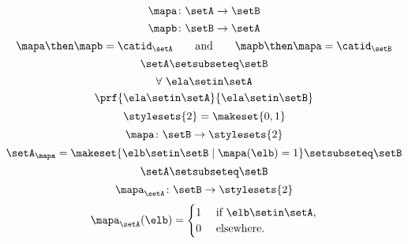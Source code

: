 \begin{forslides}
    \begin{equation}\label{eq:slides_session2_183}
        \mapa\colon \setA \to \setB
    \end{equation}
    \begin{equation}\label{eq:slides_session2_184}
        \mapb \colon \setB \to \setA
    \end{equation}
    \begin{equation}\label{eq:slides_session2_185}
        \mapa \then \mapb = \catid_\setA \qquad \text{and}  \qquad \mapb \then \mapa = \catid_\setB
    \end{equation}
    \begin{equation}\label{eq:slides_session2_186}
        \setA \setsubseteq \setB
    \end{equation}
    \begin{equation}\label{eq:slides_session2_187}
        \forall \ \ela \setin\setA
    \end{equation}
    \begin{equation}\label{eq:slides_session2_188}
        \prf{
            \ela \setin\setA
        }{
            \ela \setin\setB
        }
    \end{equation}
    \begin{equation}\label{eq:slides_session2_189}
        \stylesets{2} = \makeset{ 0, 1}
    \end{equation}
    \begin{equation}\label{eq:slides_session2_190}
        \mapa \colon \setB \to \stylesets{2}
    \end{equation}
    \begin{equation}\label{eq:slides_session2_191}
        \setA_\mapa = \makeset{ \elb \setin\setB \mid \mapa(\elb) = 1 } \setsubseteq \setB
    \end{equation}
    \begin{equation}\label{eq:slides_session2_192}
        \setA \setsubseteq \setB
    \end{equation}
    \begin{equation}\label{eq:slides_session2_193}
        \mapa_\setA \colon \setB \to \stylesets{2}
    \end{equation}
    \begin{equation}\label{eq:slides_session2_194}
        \mapa_\setA(\elb) = \begin{cases}
            1 & \text{ if }\elb\setin\setA, \\
            0 & \text{ elsewhere}.
        \end{cases}
    \end{equation}

\end{forslides}
